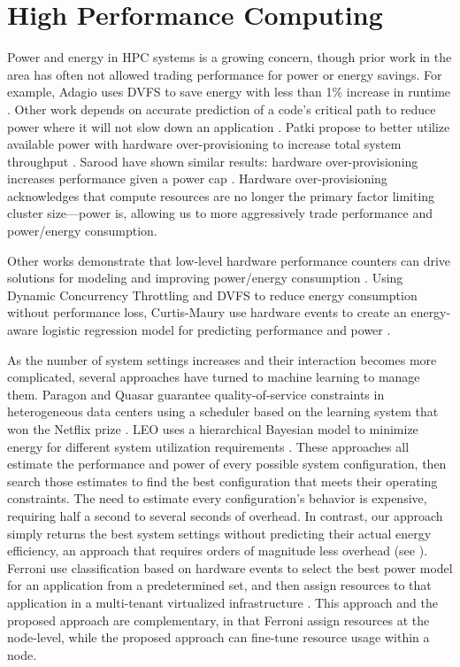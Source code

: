 \section{High Performance Computing}

Power and energy in HPC systems is a growing concern, though prior work in the area has often not allowed trading performance for power or energy savings.
For example, Adagio uses DVFS to save energy with less than 1\% increase in runtime \cite{RountreeAdagio}.
Other work depends on accurate prediction of a code's critical path to reduce power where it will not slow down an application \cite{Jitter,Marathe2015}.
Patki \etal propose to better utilize available power with hardware over-provisioning to increase total system throughput \cite{PatkiRMAP}.
Sarood \etal have shown similar results: hardware over-provisioning increases performance given a power cap \cite{Sarood2013}.
Hardware over-provisioning acknowledges that compute resources are no longer the primary factor limiting cluster size---power is, allowing us to more aggressively trade performance and power/energy consumption.

Other works demonstrate that low-level hardware performance counters can drive solutions for modeling and improving power/energy consumption \cite{WuHPCComputer,Chetsa,Libutti2014,Sasaki}.
Using Dynamic Concurrency Throttling and DVFS to reduce energy consumption without performance loss, Curtis-Maury \etal use hardware events to create an energy-aware logistic regression model for predicting performance and power \cite{Curtis-Maury2008}.

As the number of system settings increases and their interaction becomes more complicated, several approaches have turned to machine learning to manage them.
Paragon \cite{Paragon} and Quasar \cite{quasar} guarantee quality-of-service constraints in heterogeneous data centers using a scheduler based on the learning system that won the Netflix prize \cite{NetflixPrize}.
LEO uses a hierarchical Bayesian model to minimize energy for different system utilization requirements \cite{LEO}.
These approaches all estimate the performance and power of every possible system configuration, then search those estimates to find the best configuration that meets their operating constraints.
The need to estimate every configuration's behavior is expensive, requiring half a second \cite{LEO} to several seconds \cite{Paragon} of overhead.
In contrast, our approach simply returns the best system settings without predicting their actual energy efficiency, an approach that requires orders of magnitude less overhead (see ).
Ferroni \etal use classification based on hardware events to select the best power model for an application from a predetermined set, and then assign resources to that application in a multi-tenant virtualized infrastructure \cite{FerroniTACO}.
This approach and the proposed approach are complementary, in that Ferroni \etal assign resources at the node-level, while the proposed approach can fine-tune resource usage within a node.

